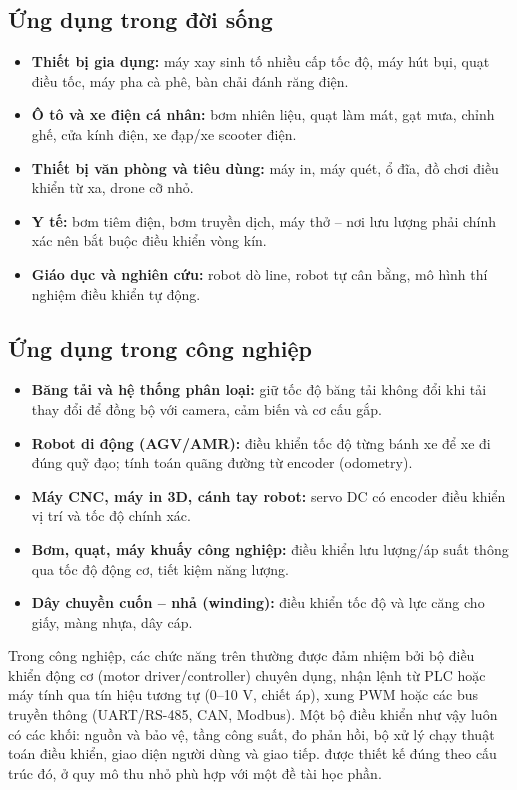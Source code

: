 \subsection{Ứng dụng trong đời sống}
\begin{itemize}
  \item \textbf{Thiết bị gia dụng:} máy xay sinh tố nhiều cấp tốc độ, máy hút bụi, quạt điều tốc, máy pha cà phê, bàn chải đánh răng điện.
  \item \textbf{Ô tô và xe điện cá nhân:} bơm nhiên liệu, quạt làm mát, gạt mưa, chỉnh ghế, cửa kính điện, xe đạp/xe scooter điện.
  \item \textbf{Thiết bị văn phòng và tiêu dùng:} máy in, máy quét, ổ đĩa, đồ chơi điều khiển từ xa, drone cỡ nhỏ.
  \item \textbf{Y tế:} bơm tiêm điện, bơm truyền dịch, máy thở -- nơi lưu lượng phải chính xác nên bắt buộc điều khiển vòng kín.
  \item \textbf{Giáo dục và nghiên cứu:} robot dò line, robot tự cân bằng, mô hình thí nghiệm điều khiển tự động.
\end{itemize}

\subsection{Ứng dụng trong công nghiệp}
\begin{itemize}
  \item \textbf{Băng tải và hệ thống phân loại:} giữ tốc độ băng tải không đổi khi tải thay đổi để đồng bộ với camera, cảm biến và cơ cấu gắp.
  \item \textbf{Robot di động (AGV/AMR):} điều khiển tốc độ từng bánh xe để xe đi đúng quỹ đạo; tính toán quãng đường từ encoder (odometry).
  \item \textbf{Máy CNC, máy in 3D, cánh tay robot:} servo DC có encoder điều khiển vị trí và tốc độ chính xác.
  \item \textbf{Bơm, quạt, máy khuấy công nghiệp:} điều khiển lưu lượng/áp suất thông qua tốc độ động cơ, tiết kiệm năng lượng.
  \item \textbf{Dây chuyền cuốn -- nhả (winding):} điều khiển tốc độ và lực căng cho giấy, màng nhựa, dây cáp.
\end{itemize}
Trong công nghiệp, các chức năng trên thường được đảm nhiệm bởi bộ điều khiển động cơ (motor driver/controller) chuyên dụng, nhận lệnh từ PLC hoặc máy tính qua tín hiệu tương tự (0--10 V, chiết áp), xung PWM hoặc các bus truyền thông (UART/RS-485, CAN, Modbus). Một bộ điều khiển như vậy luôn có các khối: nguồn và bảo vệ, tầng công suất, đo phản hồi, bộ xử lý chạy thuật toán điều khiển, giao diện người dùng và giao tiếp. \proj{} được thiết kế đúng theo cấu trúc đó, ở quy mô thu nhỏ phù hợp với một đề tài học phần.

